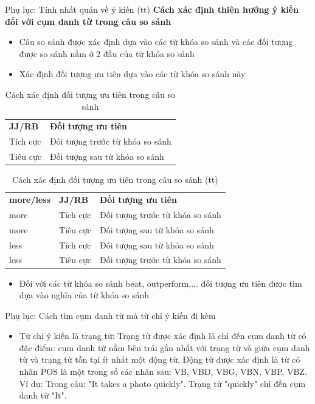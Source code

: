 \documentclass[9pt,xcolor=table,hyperref=unicode]{beamer}
\begin{document}
		\begin{frame}{Phụ lục: Tính nhất quán về ý kiến (tt)}
			\textbf{Cách xác định thiên hướng ý kiến đối với cụm danh từ trong câu so sánh}
			\begin{itemize}
				\item{Câu so sánh được xác định dựa vào các từ khóa so sánh và các đối tượng được so sánh nằm ở 2 đầu của từ khóa so sánh}
				\item{Xác định đối tượng ưu tiên dựa vào các từ khóa so sánh này}				
			\end{itemize}
			\begin{table}[]
				\centering					
				\begin{tabular}{ll}
				\textbf{JJ/RB} & \textbf{Đối tượng ưu tiên}      \\
				Tích cực       & Đối tượng trước từ khóa so sánh \\
				Tiêu cực       & Đối tượng sau từ khóa so sánh  
				\end{tabular}
				\caption{Cách xác định đối tượng ưu tiên trong câu so sánh}					
			\end{table}
			\begin{table}[]
				\centering					
				\begin{tabular}{lll}
				\textbf{more/less} & \textbf{JJ/RB} & \textbf{Đối tượng ưu tiên}      \\
				more               & Tích cực       & Đối tượng trước từ khóa so sánh \\
				more               & Tiêu cực       & Đối tượng sau từ khóa so sánh   \\
				less               & Tích cực       & Đối tượng sau từ khóa so sánh   \\
				less               & Tiêu cực       & Đối tượng trước từ khóa so sánh
				\end{tabular}
				\caption{Cách xác định đối tượng ưu tiên trong câu so sánh (tt)}					
			\end{table}
			\begin{itemize}
				\item{Đối với các từ khóa so sánh beat, outperform,... đối tượng ưu tiên được tìm dựa vào nghĩa của từ khóa so sánh}
			\end{itemize}	
		\end{frame}

		\begin{frame}{Phụ lục: Cách tìm cụm danh từ mà từ chỉ ý kiến đi kèm}
			\begin{itemize}
				\item{Từ chỉ ý kiến là trạng từ:
				Trạng từ được xác định là chỉ đến cụm danh từ có đặc điểm: cụm danh từ nằm bên trái gần nhất với trạng từ và giữa cụm danh từ và trạng từ tồn tại ít nhất một động từ. Động từ được xác định là từ có nhãn POS là một trong số các nhãn sau: VB, VBD, VBG, VBN, VBP, VBZ. Ví dụ: Trong câu: "It takes a photo quickly". Trạng từ "quickly" chỉ đến cụm danh từ "It".}				
			\end{itemize}
		\end{frame}
\end{document}
